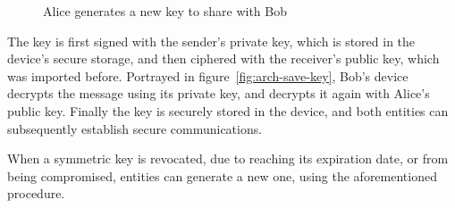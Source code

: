 \begin{figure}[h]
	\centering     %
	\caption{Alice generates a new key to share with Bob}
\end{figure}

The key is first signed with the sender's private key, which is stored in the device's secure storage, and then ciphered with the receiver's public key, which was imported before. Portrayed in figure~\ref{fig:arch-save-key}, Bob's device decrypts the message using its private key, and decrypts it again with Alice's public key. Finally the key is securely stored in the device, and both entities can subsequently establish secure communications.

When a symmetric key is revocated, due to reaching its expiration date, or from being compromised, entities can generate a new one, using the aforementioned procedure.
